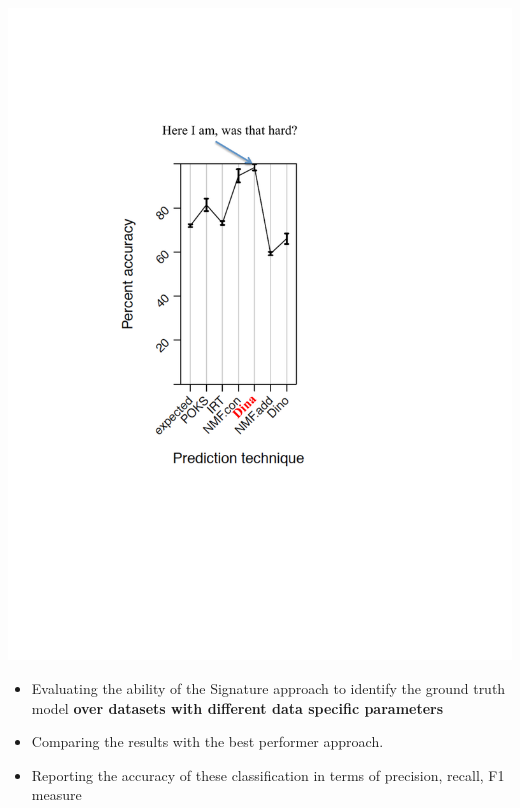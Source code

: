 \documentclass{beamer}
\begin{document}
\begin{frame}
\begin{overprint}
	\includegraphics[trim=3cm 10cm 5cm 5cm,scale=0.36]{images/BestPerformer.pdf}
\begin{itemize}
	\item Evaluating the ability of the Signature approach to identify the ground truth model \textbf{over datasets with different data specific parameters}
	\item Comparing the results with the best performer approach.
	\item Reporting the accuracy of these classification in terms of precision, recall, F1 measure
\end{itemize}
\begin{columns}
\begin{column}{.4\textwidth}
\vspace{-0.5cm}
\begin{center}


\end{center}
\end{column}
\end{columns}
\end{overprint}
\end{frame}
\end{document}
